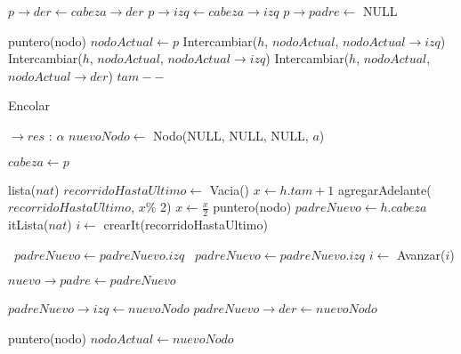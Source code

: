 \begin{Algoritmos}
\begin{algorithm}
\begin{algorithmic}[1]
    \State $p \to der \gets cabeza \to der$
    \State $p \to izq \gets cabeza \to izq$
    \State $p \to padre \gets$ NULL
  
    \State puntero(nodo) $nodoActual \gets p$
          \State Intercambiar($h$, $nodoActual$, $nodoActual \to izq$)
        \Else 
            \State Intercambiar($h$, $nodoActual$, $nodoActual \to izq$)
          \Else
             \State Intercambiar($h$, $nodoActual$, $nodoActual \to der$)
          \EndIf
        \EndIf
      \EndIf
    \EndWhile
   \EndIf
  \State $tam--$
 \EndProcedure
\end{algorithmic}
\end{algorithm}




\begin{algorithm}
\caption{Encolar}
\begin{algorithmic}[1]
   $\to res$ : $\alpha$
  \State $nuevoNodo \gets$ Nodo(NULL, NULL, NULL, $a$)

    \State $cabeza \gets p$
  \Else

    \State lista($nat$) $recorridoHastaUltimo \gets$ Vacia()
    \State $x \gets h.tam+1$
      \State agregarAdelante($recorridoHastaUltimo$, $x$\% 2)
      \State $x \gets \frac{x}{2}$
    \EndWhile
    \State puntero(nodo) $padreNuevo \gets h.cabeza$
    \State itLista($nat$) $i \gets$ crearIt(recorridoHastaUltimo)
    
    \Repeat
       \ $padreNuevo \gets padreNuevo.izq$
      \Else \  $padreNuevo \gets padreNuevo.izq$
      \EndIf
      \State $i \gets$ Avanzar($i$)
    
    \State $nuevo \to padre \gets padreNuevo$

      \State $padreNuevo \to izq \gets nuevoNodo$
    \Else
       \State $padreNuevo \to der \gets nuevoNodo$
    \EndIf

    \State puntero(nodo) $nodoActual \gets nuevoNodo$


\end{algorithmic}
\end{algorithm}
\end{Algoritmos}
